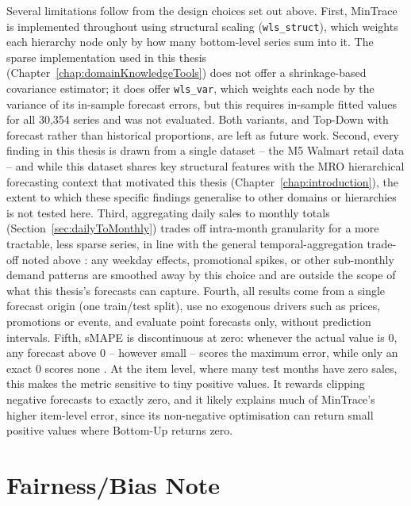 Several limitations follow from the design choices set out above. First, MinTrace is implemented throughout using structural scaling (\texttt{wls\_struct}), which weights each hierarchy node only by how many bottom-level series sum into it. The sparse implementation used in this thesis (Chapter~\ref{chap:domainKnowledgeTools}) does not offer a shrinkage-based covariance estimator; it does offer \texttt{wls\_var}, which weights each node by the variance of its in-sample forecast errors, but this requires in-sample fitted values for all 30,354 series and was not evaluated. Both variants, and Top-Down with forecast rather than historical proportions, are left as future work. Second, every finding in this thesis is drawn from a single dataset -- the M5 Walmart retail data -- and while this dataset shares key structural features with the MRO hierarchical forecasting context that motivated this thesis (Chapter~\ref{chap:introduction}), the extent to which these specific findings generalise to other domains or hierarchies is not tested here. Third, aggregating daily sales to monthly totals (Section~\ref{sec:dailyToMonthly}) trades off intra-month granularity for a more tractable, less sparse series, in line with the general temporal-aggregation trade-off noted above \cite{Athanasopoulos:2017}: any weekday effects, promotional spikes, or other sub-monthly demand patterns are smoothed away by this choice and are outside the scope of what this thesis's forecasts can capture. Fourth, all results come from a single forecast origin (one train/test split), use no exogenous drivers such as prices, promotions or events, and evaluate point forecasts only, without prediction intervals. Fifth, sMAPE is discontinuous at zero: whenever the actual value is 0, any forecast above 0 -- however small -- scores the maximum error, while only an exact 0 scores none \cite{Hyndman:2006}. At the item level, where many test months have zero sales, this makes the metric sensitive to tiny positive values. It rewards clipping negative forecasts to exactly zero, and it likely explains much of MinTrace's higher item-level error, since its non-negative optimisation can return small positive values where Bottom-Up returns zero.

\section{Fairness/Bias Note}
\label{sec:fairnessNote}

